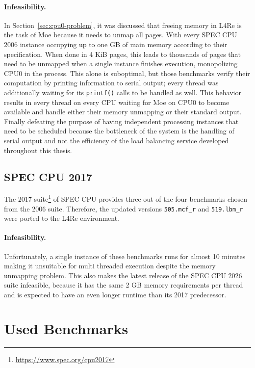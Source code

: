 \paragraph{Infeasibility.}

In Section~\ref{sec:cpu0-problem}, it was discussed that freeing memory in L4Re is the task of Moe because it needs to unmap all pages.
With every SPEC CPU 2006 instance occupying up to one GB of main memory according to their specification.
When done in 4 KiB pages, this leads to thousands of pages that need to be unmapped when a single instance finishes execution, monopolizing CPU0 in the process.
This alone is suboptimal, but those benchmarks verify their computation by printing information to serial output; every thread was additionally waiting for its \texttt{printf()} calls to be handled as well.
This behavior results in every thread on every CPU waiting for Moe on CPU0 to become available and handle either their memory unmapping or their standard output.
Finally defeating the purpose of having independent processing instances that need to be scheduled because the bottleneck of the system is the handling of serial output and not the efficiency of the load balancing service developed throughout this thesis.

\subsection{SPEC CPU 2017}

The 2017 suite\footnote{\url{https://www.spec.org/cpu2017}} of SPEC CPU provides three out of the four benchmarks chosen from the 2006 suite.
Therefore, the updated versions \texttt{505.mcf\_r} and \texttt{519.lbm\_r} were ported to the L4Re environment.

\paragraph{Infeasibility.}

Unfortunately, a single instance of these benchmarks runs for almost 10 minutes making it unsuitable for multi threaded execution despite the memory unmapping problem. This also makes the latest release of the SPEC CPU 2026 suite infeasible, because it has the same 2 GB memory requirements per thread and is expected to have an even longer runtime than its 2017 predecessor. 

\section{Used Benchmarks}
\label{sec:bench-used}

